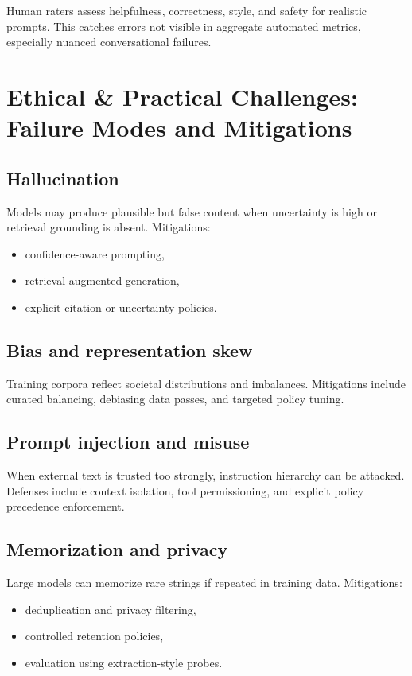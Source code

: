 \documentclass[12pt]{article}
\begin{document}
Human raters assess helpfulness, correctness, style, and safety for realistic prompts. This catches errors not visible in aggregate automated metrics, especially nuanced conversational failures.

\section{Ethical \& Practical Challenges: Failure Modes and Mitigations}

\subsection{Hallucination}

Models may produce plausible but false content when uncertainty is high or retrieval grounding is absent. Mitigations:
\begin{itemize}
    \item confidence-aware prompting,
    \item retrieval-augmented generation,
    \item explicit citation or uncertainty policies.
\end{itemize}

\subsection{Bias and representation skew}

Training corpora reflect societal distributions and imbalances. Mitigations include curated balancing, debiasing data passes, and targeted policy tuning.

\subsection{Prompt injection and misuse}

When external text is trusted too strongly, instruction hierarchy can be attacked. Defenses include context isolation, tool permissioning, and explicit policy precedence enforcement.

\subsection{Memorization and privacy}

Large models can memorize rare strings if repeated in training data. Mitigations:
\begin{itemize}
    \item deduplication and privacy filtering,
    \item controlled retention policies,
    \item evaluation using extraction-style probes.
\end{itemize}
\end{document}
